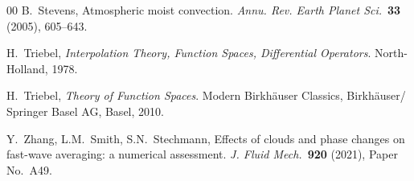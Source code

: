 \documentclass[10pt]{amsart}
\theoremstyle{plain}
\theoremstyle{definition}
\theoremstyle{thm}
\numberwithin{equation}{section}
\begin{document}
\begin{thebibliography}{00}
B.~Stevens, 
Atmospheric moist convection.
{\it Annu. Rev. Earth Planet Sci.}~{\bf 33} (2005), 605--643.

H.~Triebel,
{\it Interpolation Theory, Function Spaces, Differential Operators}. North-Holland, 1978.

H.~Triebel,
{\it Theory of Function Spaces}. Modern Birkh\"auser Classics, Birkh\"auser/ Springer Basel AG, Basel, 2010.

Y.~Zhang, L.M.~Smith, S.N.~Stechmann, 
Effects of clouds and phase changes on fast-wave averaging: a numerical assessment.
{\it J. Fluid Mech.}~{\bf 920} (2021), Paper No.~A49.

\end{thebibliography}
\end{document}

